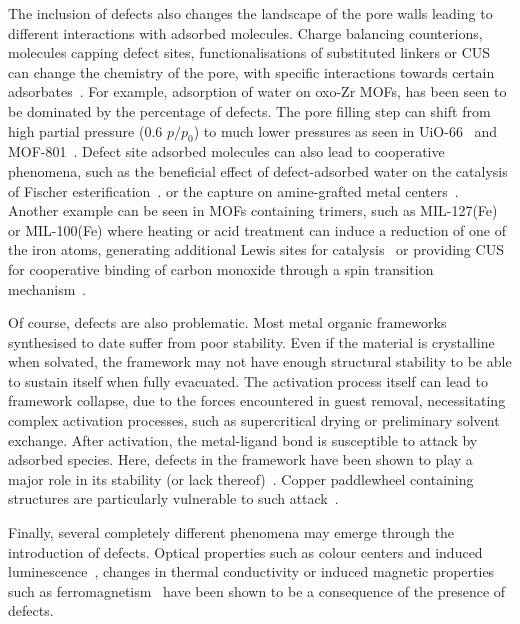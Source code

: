 The inclusion of defects also changes the landscape of the pore
walls leading to different interactions with adsorbed molecules.
Charge balancing counterions, molecules capping defect sites,
functionalisations of substituted linkers or CUS can change the
chemistry of the pore, with specific interactions towards certain
adsorbates~\cite{dissegnaUsingWaterAdsorption2017}.
For example, adsorption of water on oxo-Zr MOFs, has been seen to
be dominated by the percentage of defects. The pore filling step can
shift from high partial pressure (0.6 \(p/p_0\)) to much lower pressures
as seen in UiO-66~\cite{ghoshWaterAdsorptionUiO662014} and
MOF-801~\cite{choiRoleStructuralDefects2018}. Defect site adsorbed
molecules can also lead to cooperative phenomena,
such as the beneficial effect of defect-adsorbed water on the
catalysis of Fischer esterification~\cite{caratelliNatureActiveSites2017}.
or the  capture on amine-grafted metal 
centers~\cite{mcdonaldCooperativeInsertionCO22015}.
Another example can be seen in MOFs containing  trimers,
such as MIL-127(Fe) or MIL-100(Fe) where heating or acid treatment
can induce a reduction of one of the iron atoms, generating
additional Lewis sites for catalysis~\cite{yoonControlledReducibilityMetalOrganic2010}
or providing CUS for cooperative binding of carbon monoxide through
a spin transition mechanism~\cite{reedSpinTransitionMechanism2017}.

Of course, defects are also problematic. Most metal organic frameworks
synthesised to date suffer from poor stability. Even if the material
is crystalline when solvated, the framework may not have
enough structural stability to be able to sustain itself when fully
evacuated. The activation process itself can lead to framework
collapse, due to the forces encountered in guest removal, necessitating
complex activation processes, such as supercritical drying or
preliminary solvent exchange. After activation, the metal-ligand bond
is susceptible to attack by adsorbed species. Here, defects in the framework
have been shown to play a major role in its stability (or lack
thereof)~\cite{burtchWaterStabilityAdsorption2014}.
Copper paddlewheel containing structures are particularly vulnerable to
such attack~\cite{alvarezStructureStabilityHKUST12017}.

Finally, several completely different phenomena may emerge through
the introduction of defects. Optical properties such as colour
centers and induced luminescence~\cite{mullerDefectsColorCenters2017},
changes in thermal conductivity or induced magnetic properties
such as ferromagnetism~\cite{shenOriginLongRangeFerromagnetic2012}
have been shown to be a consequence of the presence of defects.

